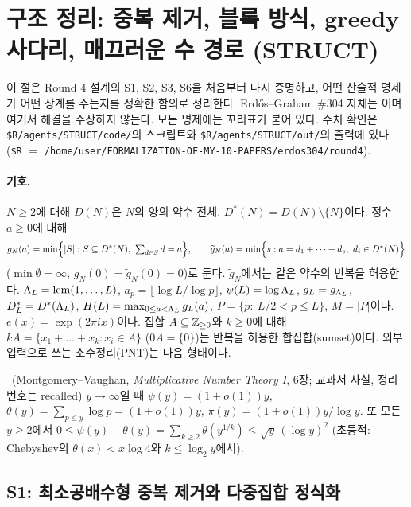\section{구조 정리: 중복 제거, 블록 방식, greedy 사다리, 매끄러운 수 경로 (STRUCT)}
\label{STRUCT:sec}

이 절은 Round 4 설계의 S1, S2, S3, S6을 처음부터 다시 증명하고, 어떤 산술적 명제가 어떤 상계를 주는지를 정확한 함의로 정리한다.
Erdős--Graham \#304 자체는 \OPEN 이며 여기서 해결을 주장하지 않는다.
모든 명제에는 꼬리표가 붙어 있다. 수치 확인은 \texttt{\$R/agents/STRUCT/code/}의 스크립트와 \texttt{\$R/agents/STRUCT/out/}의 출력에 있다
(\texttt{\$R} $=$ \texttt{/home/user/FORMALIZATION-OF-MY-10-PAPERS/erdos304/round4}).

\paragraph{기호.}
$N\ge 2$에 대해 $D(N)$은 $N$의 양의 약수 전체, $D^*(N)=D(N)\setminus\{N\}$이다.
정수 $a\ge 0$에 대해
\[
g_N(a)=\min\Bigl\{|S| : S\subseteq D^*(N),\ \textstyle\sum_{d\in S}d=a\Bigr\},\qquad
\widetilde g_N(a)=\min\Bigl\{s : a=d_1+\dots+d_s,\ d_i\in D^*(N)\Bigr\}
\]
($\min\emptyset=\infty$, $g_N(0)=\widetilde g_N(0)=0$)로 둔다. $\widetilde g_N$에서는 같은 약수의 반복을 허용한다.
$\Lambda_L=\operatorname{lcm}(1,\dots,L)$, $a_p=\lfloor \log L/\log p\rfloor$, $\psi(L)=\log\Lambda_L$, $g_L=g_{\Lambda_L}$, $D^*_L=D^*(\Lambda_L)$,
$H(L)=\max_{0\le a<\Lambda_L}g_L(a)$, $P=\{p:\ L/2<p\le L\}$, $M=|P|$이다.
$e(x)=\exp(2\pi i x)$이다. 집합 $A\subseteq\mathbb{Z}_{\ge0}$와 $k\ge 0$에 대해 $kA=\{x_1+\dots+x_k: x_i\in A\}$ ($0A=\{0\}$)는 반복을 허용한 합집합(sumset)이다.
외부 입력으로 쓰는 소수정리(PNT)는 다음 형태이다.

\begin{theorem}\label{STRUCT:ext-pnt}
\EXT\ (Montgomery--Vaughan, \emph{Multiplicative Number Theory I}, 6장; 교과서 사실, 정리 번호는 recalled)
$y\to\infty$일 때 $\psi(y)=(1+o(1))y$, $\theta(y)=\sum_{p\le y}\log p=(1+o(1))y$, $\pi(y)=(1+o(1))y/\log y$.
또 모든 $y\ge 2$에서 $0\le\psi(y)-\theta(y)=\sum_{k\ge2}\theta(y^{1/k})\le \sqrt y\,(\log y)^2$ (초등적: Chebyshev의 $\theta(x)<x\log 4$와 $k\le\log_2 y$에서).
\end{theorem}

\subsection{S1: 최소공배수형 중복 제거와 다중집합 정식화}
\label{STRUCT:sec-S1}

